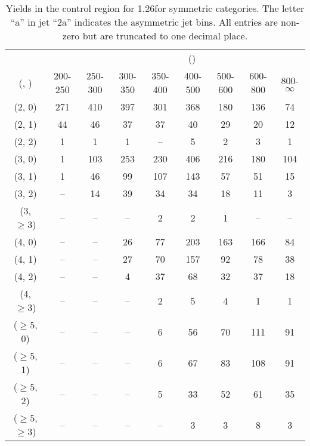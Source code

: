 \begin{table}[h!]
\tiny
\centering
\caption{Yields in the \mj control region for 1.26\ifb for symmetric categories. The letter ``a'' in jet \eg ``2a''  indicates the asymmetric jet bins. All entries are non-zero but are truncated to one decimal place.\label{tab:yieldssep_mu_data_sym}}
\begin{tabular}
{ccccccccc}
	\hline\hline
&	& \multicolumn{8}{c}{\scalht (\gev)} \\ 
	 (\njet,  \nb) & 200-250 & 250-300 & 300-350 & 350-400 & 400-500 & 500-600 & 600-800 & 800-$\infty$ \\ [0.8ex] 
\hline
	(2, 0) & 271 & 410 & 397 & 301 & 368 & 180 & 136 & 74 \\[0.5ex] 
	(2, 1) & 44 & 46 & 37 & 37 & 40 & 29 & 20 & 12 \\[0.5ex] 
	(2, 2) & 1 & 1 & 1 & -- & 5 & 2 & 3 & 1 \\[0.5ex] 
	(3, 0) & 1 & 103 & 253 & 230 & 406 & 216 & 180 & 104 \\[0.5ex] 
	(3, 1) & 1 & 46 & 99 & 107 & 143 & 57 & 51 & 15 \\[0.5ex] 
	(3, 2) & -- & 14 & 39 & 34 & 34 & 18 & 11 & 3 \\[0.5ex] 
	(3, $\ge3$) & -- & -- & -- & 2 & 2 & 1 & -- & -- \\[0.5ex] 
	(4, 0) & -- & -- & 26 & 77 & 203 & 163 & 166 & 84 \\[0.5ex] 
	(4, 1) & -- & -- & 27 & 70 & 157 & 92 & 78 & 38 \\[0.5ex] 
	(4, 2) & -- & -- & 4 & 37 & 68 & 32 & 37 & 18 \\[0.5ex] 
	(4, $\ge3$) & -- & -- & -- & 2 & 5 & 4 & 1 & 1 \\[0.5ex] 
	($\ge5$, 0) & -- & -- & -- & 6 & 56 & 70 & 111 & 91 \\[0.5ex] 
	($\ge5$, 1) & -- & -- & -- & 6 & 67 & 83 & 108 & 91 \\[0.5ex] 
	($\ge5$, 2) & -- & -- & -- & 5 & 33 & 52 & 61 & 35 \\[0.5ex] 
	($\ge5$, $\ge3$) & -- & -- & -- & -- & 3 & 3 & 8 & 3 \\[0.5ex] 
	\hline
	\hline
\end{tabular}
\end{table}
